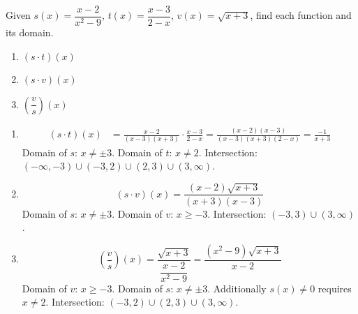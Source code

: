 \documentclass{ximera}
\begin{document}
\begin{problem}
Given $s(x) = \dfrac{x-2}{x^2-9}$, $t(x) = \dfrac{x-3}{2-x}$, $v(x) = \sqrt{x+3}$, find each function and its domain.
\begin{enumerate}
  \item[(a)] $(s\cdot t)(x)$
  \medskip
  \item[(b)] $(s\cdot v)(x)$
  \medskip
  \item[(c)] $\left(\dfrac{v}{s}\right)(x)$
\end{enumerate}

\begin{solution}
\begin{enumerate}
  \item[(a)]
  \begin{align*}
    (s\cdot t)(x) &= \frac{x-2}{(x-3)(x+3)}\cdot\frac{x-3}{2-x} = \frac{(x-2)(x-3)}{(x-3)(x+3)(2-x)} = \frac{-1}{x+3}
  \end{align*}
  Domain of $s$: $x\neq\pm3$. Domain of $t$: $x\neq 2$. Intersection: $(-\infty,-3)\cup(-3,2)\cup(2,3)\cup(3,\infty)$.

  \item[(b)]
  $$(s\cdot v)(x) = \frac{(x-2)\sqrt{x+3}}{(x+3)(x-3)}$$
  Domain of $s$: $x\neq\pm3$. Domain of $v$: $x\geq-3$. Intersection: $(-3,3)\cup(3,\infty)$.

  \item[(c)]
  $$\left(\frac{v}{s}\right)(x) = \frac{\sqrt{x+3}}{\dfrac{x-2}{x^2-9}} = \frac{(x^2-9)\sqrt{x+3}}{x-2}$$
  Domain of $v$: $x\geq-3$. Domain of $s$: $x\neq\pm3$. Additionally $s(x)\neq0$ requires $x\neq2$. Intersection: $(-3,2)\cup(2,3)\cup(3,\infty)$.
\end{enumerate}
\end{solution}
\end{problem}
\end{document}
